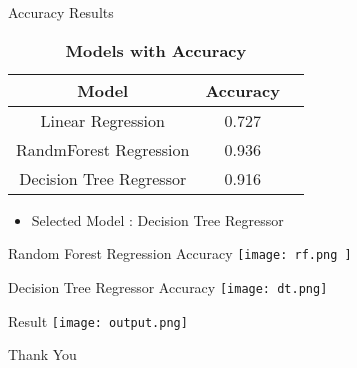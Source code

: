 \documentclass{beamer}
\begin{document}
\begin{frame}{Accuracy Results}
    \begin{table}
\centering
\caption{\large \textbf{Models with Accuracy}}
\begin{tabular}{|c|c|c|}
\hline
\textbf{Model} & \textbf{Accuracy}  \\
\hline
Linear Regression & 0.727 \\
\hline
RandmForest Regression & 0.936 \\
\hline
Decision Tree Regressor & 0.916 \\

\hline
\end{tabular}
\end{table}
\begin{itemize}
    \item Selected Model : Decision Tree Regressor\\
\end{itemize} 
\end{frame}


\begin{frame}{Random Forest Regression Accuracy}
    \texttt{[image: rf.png ]}
\end{frame}


\begin{frame}{Decision Tree Regressor Accuracy}
    \texttt{[image: dt.png]}
\end{frame}

\begin{frame}{Result}
    \texttt{[image: output.png]}
\end{frame}

\begin{frame}\begin{center}
\Huge {Thank You}
\end{center}
   
\end{frame}
 
\end{document}
